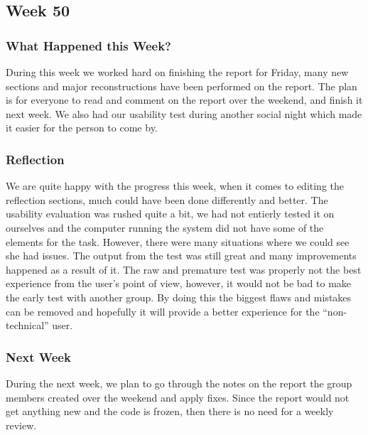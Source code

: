 \subsection{Week 50}
\subsubsection{What Happened this Week?}
During this week we worked hard on finishing the report for Friday, many new
sections and major reconstructions have been performed on the report. The plan
is for everyone to read and comment on the report over the weekend, and finish
it next week. We also had our usability test during another social night which
made it easier for the person to come by.

\subsubsection{Reflection}
We are quite happy with the progress this week, when it comes to editing
the reflection sections, much could have been done differently and better. The
usability evaluation was rushed quite a bit, we had not entierly tested it on
ourselves and the computer running the system did not have some of the elements
for the task.
However, there were many situations where we could see she had issues. The
output from the test was still great and many improvements happened as a result
of it. The raw and premature test was properly not the best experience from the
user's point of view, however, it would not be bad to make the early test with
another group.
By doing this the biggest flaws and mistakes can be removed and
hopefully it will provide a better experience for the ``non-technical'' user.

\subsubsection{Next Week}
During the next week, we plan to go through the notes on the report the group
members created over the weekend and apply fixes. Since the report would not get
anything new and the code is frozen, then there is no need for a weekly review.
